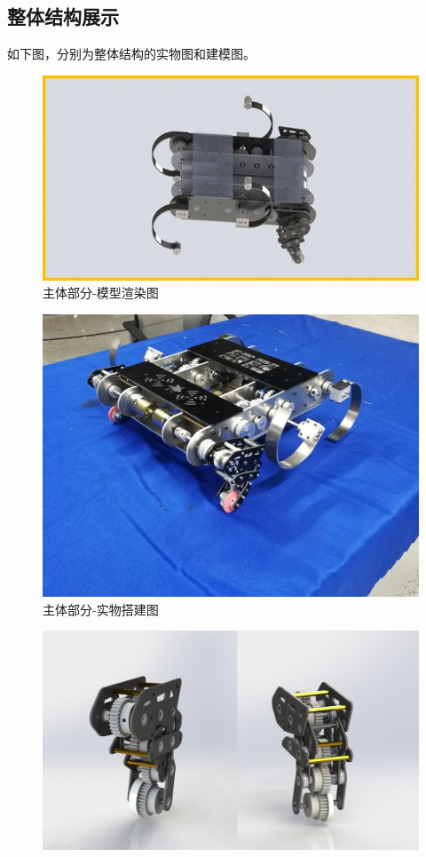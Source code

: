 \documentclass[12pt]{article}
\begin{document}
\begin{CJK}{UTF8}{song}
\subsection{整体结构展示}
如下图，分别为整体结构的实物图和建模图。
\renewcommand {\thefigure} {\thesubsection{}.\arabic{figure}}
\begin{figure}[H]
\centering
\includegraphics[width=.8\textwidth]{chap2//fig2.jpg}
\caption{主体部分-模型渲染图}
\end{figure}
\begin{figure}[H]
\centering
\includegraphics[width=.8\textwidth]{chap2//fig1.jpg}
\caption{主体部分-实物搭建图}
\end{figure}
\begin{figure}[H]
\centering
\includegraphics[width=.8\textwidth]{chap2//figa.jpg}

\end{figure}
\end{CJK}
\end{document}
